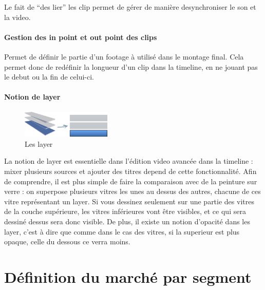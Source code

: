 Le fait de ``des lier'' les clip permet de gérer de manière desynchroniser le son
et la video.

\paragraph{Gestion des in point et  out point des clips} %
  Permet de définir le partie d'un footage à utilisé dans le montage final. Cela permet donc de
  redéfinir la longueur d'un clip dans la timeline, en ne jouant pas le debut
  ou la fin de celui-ci.

\paragraph{}

\paragraph{Notion de layer}
  \begin{figure}
    \begin{center}
      \vspace{-20pt}
      \includegraphics[width=0.38\textwidth]{images/layers}
    \end{center}
    \vspace{-20pt}
    \caption{Les layer}
    \label{Yes}
  \end{figure}

La notion de layer est essentielle dans l'édition video avancée dans la
timeline : mixer plusieurs sources et ajouter des titres depend de cette
fonctionnalité. Afin de comprendre, il est plus simple de faire la comparaison
avec de la peinture sur verre : on superpose plusieurs vitres les unes au
dessus des autres, chacune de ces vitre représentant un layer. Si vous
dessinez seulement sur une partie des vitres de la couche supérieure, les vitres
inférieures vont être visibles, et ce qui sera dessiné dessus sera donc visible.
De plus, il existe un notion d'opacité dans les layer, c'est à dire que comme dans le cas des vitres,
si la superieur est plus opaque, celle du dessous ce verra moins. %

\newpage

\section{Définition du marché par segment}

